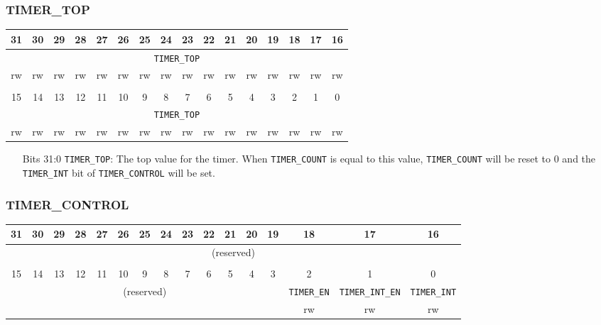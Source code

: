 \documentclass[11pt,openany]{report}
\begin{document}
\subsubsection{TIMER\_TOP}
\begin{center}
  \begin{tabular}{|c|c|c|c|c|c|c|c|c|c|c|c|c|c|c|c|}
    \hline
    31 & 30 & 29 & 28 & 27 & 26 & 25 & 24 & 23 & 22 & 21 & 20 & 19 & 18 & 17 & 16 \\
    \hline
    \multicolumn{16}{|c|}{\texttt{TIMER\_TOP}}\\
    \hline
    rw & rw & rw & rw & rw & rw & rw & rw & rw & rw & rw & rw & rw & rw & rw & rw\\
    \hline
    \multicolumn{16}{c}{}\\
    \hline
    15 & 14 & 13 & 12 & 11 & 10 & 9 & 8 & 7 & 6 & 5 & 4 & 3 & 2 & 1 & 0 \\
    \hline
    \multicolumn{16}{|c|}{\texttt{TIMER\_TOP}}\\
    \hline
    rw & rw & rw & rw & rw & rw & rw & rw & rw & rw & rw & rw & rw & rw & rw & rw\\
    \hline
  \end{tabular}
\end{center}

\begin{enumerate}
  \item[Bits 31:0] \verb|TIMER_TOP|: The top value for the timer. When \verb|TIMER_COUNT|
              is equal to this value, \verb|TIMER_COUNT| will be reset to 0 and
              the \verb|TIMER_INT| bit of \verb|TIMER_CONTROL| will be set.
\end{enumerate}

\subsubsection{TIMER\_CONTROL}
\begin{center}
  \begin{tabular}{|c|c|c|c|c|c|c|c|c|c|c|c|c|c|c|c|}
    \hline
    31 & 30 & 29 & 28 & 27 & 26 & 25 & 24 & 23 & 22 & 21 & 20 & 19 & 18 & 17 & 16 \\
    \hline
    \multicolumn{16}{|c|}{\multirow{2}{*}{(reserved)}}\\
    \multicolumn{16}{|c|}{}\\
    \hline
    \multicolumn{16}{c}{}\\
    \hline
    15 & 14 & 13 & 12 & 11 & 10 & 9 & 8 & 7 & 6 & 5 & 4 & 3 & 2 & 1 & 0 \\
    \hline
    \multicolumn{13}{|c|}{\multirow{2}{*}{(reserved)}} & \texttt{TIMER\_EN} & \texttt{TIMER\_INT\_EN} & \texttt{TIMER\_INT} \\
    \cline{14-16}
    \multicolumn{13}{|c|}{} & rw & rw & rw\\
    \hline
  \end{tabular}
\end{center}
\end{document}
